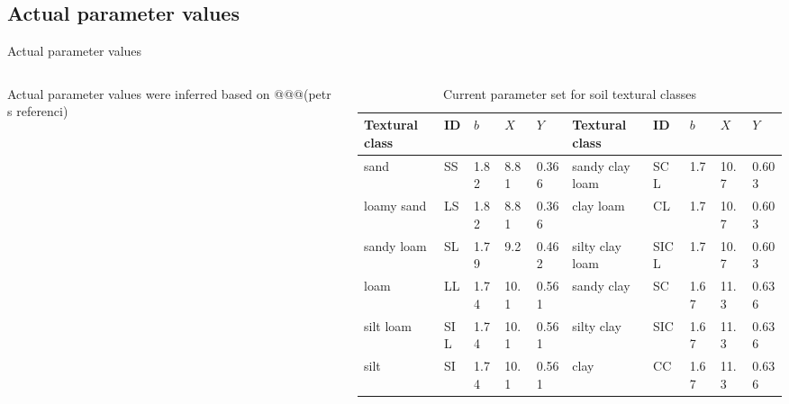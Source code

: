 \subsection{Actual parameter values}
\begin{block}{Actual parameter values}\vspace{-1cm}
\begin{columns}
    \begin{column}{0.25\textwidth}
        Actual parameter values were inferred based on @@@(petr s referenci)
    \end{column}
    \begin{column}{0.75\textwidth}
        \begin{table}[]
            \small
            \caption{Current parameter set for soil textural classes}
            \begin{tabular}{lllll|lllll}
            \hline
            \hline
            Textural class & ID  & $b$    & $X$    & $Y$     & Textural class  & ID   & $b$    & $X$    & $Y$  \\
            \hline
            sand           & SS  & 1.82 & 8.81 & 0.366 & sandy clay loam & SCL  & 1.7  & 10.7 & 0.603 \\
            loamy sand     & LS  & 1.82 & 8.81 & 0.366 & clay loam       & CL   & 1.7  & 10.7 & 0.603 \\
            sandy loam     & SL  & 1.79 & 9.2  & 0.462 & silty clay loam & SICL & 1.7  & 10.7 & 0.603 \\
            loam           & LL  & 1.74 & 10.1 & 0.561 & sandy clay      & SC   & 1.67 & 11.3 & 0.636 \\
            silt loam      & SIL & 1.74 & 10.1 & 0.561 & silty clay      & SIC  & 1.67 & 11.3 & 0.636 \\
            silt           & SI  & 1.74 & 10.1 & 0.561 & clay            & CC   & 1.67 & 11.3 & 0.636 \\
            \hline
            \hline
            \end{tabular}
        \end{table}
    \end{column}
\end{columns}
    
\end{block}

